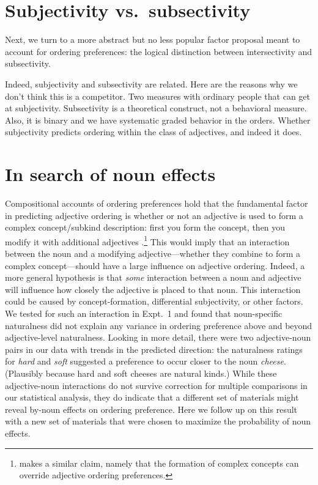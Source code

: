 \documentclass[12pt]{article}
\begin{document}
\section{Subjectivity vs.~subsectivity}

Next, we turn to a more abstract but no less popular factor proposal meant to account for ordering preferences: the logical distinction between intersectivity and subsectivity.

Indeed, subjectivity and subsectivity are related. Here are the reasons why we don’t think this is a competitor. Two measures with ordinary people that can get at subjectivity. Subsectivity is a theoretical construct, not a behavioral measure. Also, it is binary and we have systematic graded behavior in the orders. Whether subjectivity predicts ordering within the class of adjectives, and indeed it does.



\section{In search of noun effects}

Compositional accounts of ordering preferences hold that the fundamental factor in predicting adjective ordering is whether or not an adjective is used to form a complex concept/subkind description: first you form the concept, then you modify it with additional adjectives \citep{McNally2004,svenonius2008}.\footnote{\cite{bouchard2005} makes a similar claim, namely that the formation of complex concepts can override adjective ordering preferences.} 
This would imply that an interaction between the noun and a modifying adjective---whether they combine to form a complex concept---should have a large influence on adjective ordering. 
Indeed, a more general hypothesis is that \emph{some} interaction between a noun and adjective will influence how closely the adjective is placed to that noun. This interaction could be caused by concept-formation, differential subjectivity, or other factors. We tested for such an interaction in Expt.~1 and found that noun-specific naturalness did not explain any variance in ordering preference above and beyond adjective-level naturalness. Looking in more detail, there were two adjective-noun pairs in our data with trends in the predicted direction: the naturalness ratings for \emph{hard} and \emph{soft} suggested a preference to occur closer to the noun \emph{cheese}. (Plausibly because hard and soft cheeses are natural kinds.) While these adjective-noun interactions do not survive correction for multiple comparisons in our statistical analysis, they do indicate that a different set of materials might reveal by-noun effects on ordering preference. Here we follow up on this result with a new set of materials that were chosen to maximize the probability of noun effects.
\end{document}
